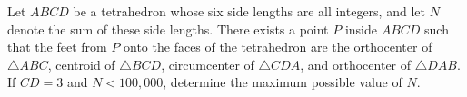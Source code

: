 Let $ABCD$ be a tetrahedron whose six side lengths are all integers, and let $N$ denote the sum of these side lengths. There exists a point $P$ inside $ABCD$ such that the feet from $P$ onto the faces of the tetrahedron are the orthocenter of $\triangle ABC$, centroid of $\triangle BCD$, circumcenter of $\triangle CDA$, and orthocenter of $\triangle DAB$. If $CD = 3$ and $N < 100{,}000$, determine the maximum possible value of $N$.
